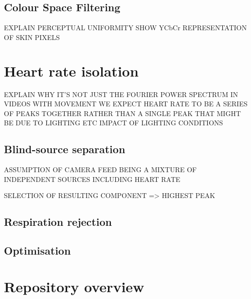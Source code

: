 \subsection{Colour Space Filtering}
EXPLAIN PERCEPTUAL UNIFORMITY 
SHOW YCbCr REPRESENTATION OF SKIN PIXELS


\section{Heart rate isolation}
EXPLAIN WHY IT'S NOT JUST THE FOURIER POWER SPECTRUM
IN VIDEOS WITH MOVEMENT WE EXPECT HEART RATE TO BE A SERIES OF PEAKS TOGETHER RATHER THAN A SINGLE PEAK
THAT MIGHT BE DUE TO LIGHTING ETC
IMPACT OF LIGHTING CONDITIONS

\subsection{Blind-source separation}
ASSUMPTION OF CAMERA FEED BEING A MIXTURE OF INDEPENDENT SOURCES INCLUDING HEART RATE

SELECTION OF RESULTING COMPONENT => HIGHEST PEAK



\subsection{Respiration rejection}

\subsection{Optimisation}

\section{Repository overview}
